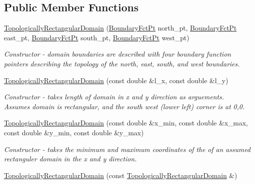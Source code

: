 \subsection*{Public Member Functions}
\begin{DoxyCompactItemize}
\item 
\hyperlink{classoomph_1_1TopologicallyRectangularDomain_acd15ad13385a5077c83f73008638f4fe}{Topologically\+Rectangular\+Domain} (\hyperlink{classoomph_1_1TopologicallyRectangularDomain_a8b2e24f5500d86c93aef509c5410e7cc}{Boundary\+Fct\+Pt} north\+\_\+pt, \hyperlink{classoomph_1_1TopologicallyRectangularDomain_a8b2e24f5500d86c93aef509c5410e7cc}{Boundary\+Fct\+Pt} east\+\_\+pt, \hyperlink{classoomph_1_1TopologicallyRectangularDomain_a8b2e24f5500d86c93aef509c5410e7cc}{Boundary\+Fct\+Pt} south\+\_\+pt, \hyperlink{classoomph_1_1TopologicallyRectangularDomain_a8b2e24f5500d86c93aef509c5410e7cc}{Boundary\+Fct\+Pt} west\+\_\+pt)
\begin{DoxyCompactList}\small\item\em Constructor -\/ domain boundaries are described with four boundary function pointers describing the topology of the north, east, south, and west boundaries. \end{DoxyCompactList}\item 
\hyperlink{classoomph_1_1TopologicallyRectangularDomain_a2b21567d1c94ec14df12c9390a9dd195}{Topologically\+Rectangular\+Domain} (const double \&l\+\_\+x, const double \&l\+\_\+y)
\begin{DoxyCompactList}\small\item\em Constructor -\/ takes length of domain in x and y direction as arguements. Assumes domain is rectangular, and the south west (lower left) corner is at 0,0. \end{DoxyCompactList}\item 
\hyperlink{classoomph_1_1TopologicallyRectangularDomain_a6b00e4df8a228538f9beac85e2927033}{Topologically\+Rectangular\+Domain} (const double \&x\+\_\+min, const double \&x\+\_\+max, const double \&y\+\_\+min, const double \&y\+\_\+max)
\begin{DoxyCompactList}\small\item\em Constructor -\/ takes the minimum and maximum coordinates of the of an assumed rectanguler domain in the x and y direction. \end{DoxyCompactList}\item 
\hyperlink{classoomph_1_1TopologicallyRectangularDomain_a31181fa9d4032d7a1f3aa93fa011b85c}{Topologically\+Rectangular\+Domain} (const \hyperlink{classoomph_1_1TopologicallyRectangularDomain}{Topologically\+Rectangular\+Domain} \&)

\end{DoxyCompactItemize}

